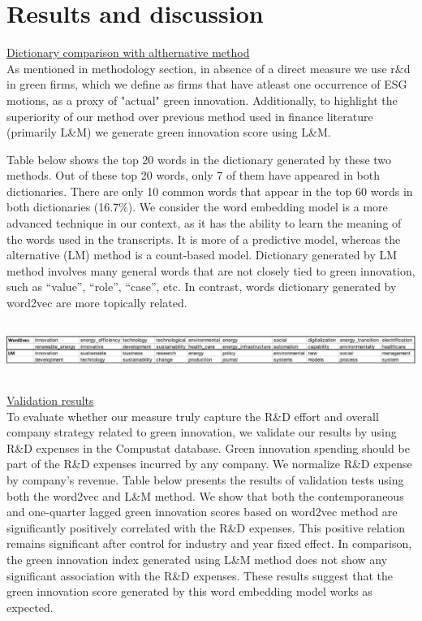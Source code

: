 \documentclass[10pt]{article}
\begin{document}
\section{Results and discussion}
\underline{Dictionary comparison with althernative method}\\
As mentioned in methodology section, in absence of a direct measure we use r\&d in green firms, which we define as firms that have atleast one occurrence of ESG motions, as a proxy of "actual" green innovation. Additionally, to highlight the superiority of our method over previous method used in finance literature (primarily L\&M) we generate green innovation score using L\&M. 

Table below shows the top 20 words in the dictionary generated by these two methods. Out of these top 20 words, only 7 of them have appeared in both dictionaries. There are only 10 common words that appear in the top 60 words in both dictionaries (16.7\%). We consider the word embedding model is a more advanced technique in our context, as it has the ability to learn the meaning of the words used in the transcripts. It is more of a predictive model, whereas the alternative (LM) method is a count-based model. Dictionary generated by LM method involves many general words that are not closely tied to green innovation, such as ``value'', ``role'', ``case'', etc. In contrast, words dictionary generated by word2vec are more topically related. 
 \\
 \\
\includegraphics[height=1.5cm, width=18cm]{dict.png}\\
\\
\underline{Validation results}\\
To evaluate whether our measure truly capture the R\&D effort and overall company strategy related to green innovation, we validate our results by using R\&D expenses in the Compustat database. Green innovation spending should be part of the R\&D expenses incurred by any company. We normalize R\&D expense by company's revenue. Table below presents the results of validation tests using both the word2vec and L\&M method. We show that both the contemporaneous and one-quarter lagged green innovation scores based on word2vec method are significantly positively correlated with the R\&D expenses. This positive relation remains significant after control for industry and year fixed effect. In comparison, the green innovation index generated using L\&M method does not show any significant association with the R\&D expenses. These results suggest that the green innovation score generated by this word embedding model works as expected. 
\\
\end{document}
